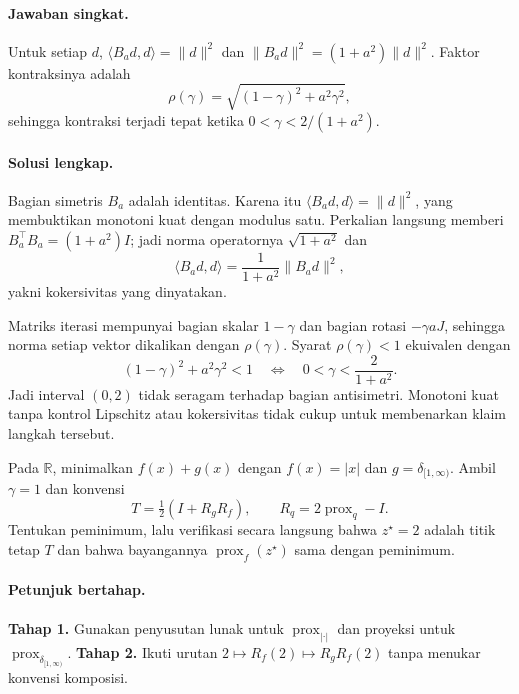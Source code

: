 \paragraph{Jawaban singkat.}
\label{orig03:ps05:answer:0003}
Untuk setiap $d$,
$\langle B_ad,d\rangle=\lVert d\rVert^2$ dan
$\lVert B_ad\rVert^2=(1+a^2)\lVert d\rVert^2$. Faktor kontraksinya adalah
\[
 \rho(\gamma)=\sqrt{(1-\gamma)^2+a^2\gamma^2},
\]
sehingga kontraksi terjadi tepat ketika
$0<\gamma<2/(1+a^2)$.

\paragraph{Solusi lengkap.}
\label{orig03:ps05:solution:0003}
Bagian simetris $B_a$ adalah identitas. Karena itu
$\langle B_ad,d\rangle=\lVert d\rVert^2$, yang membuktikan monotoni kuat
dengan modulus satu. Perkalian langsung memberi
$B_a^\top B_a=(1+a^2)I$; jadi norma operatornya
$\sqrt{1+a^2}$ dan
\[
 \langle B_ad,d\rangle
 =\frac1{1+a^2}\lVert B_ad\rVert^2,
\]
yakni kokersivitas yang dinyatakan.

Matriks iterasi mempunyai bagian skalar $1-\gamma$ dan bagian rotasi
$-\gamma aJ$, sehingga norma setiap vektor dikalikan dengan
$\rho(\gamma)$. Syarat $\rho(\gamma)<1$ ekuivalen dengan
\[
 (1-\gamma)^2+a^2\gamma^2<1
 \quad\Longleftrightarrow\quad
 0<\gamma<\frac{2}{1+a^2}.
\]
Jadi interval $(0,2)$ tidak seragam terhadap bagian antisimetri. Monotoni kuat
tanpa kontrol Lipschitz atau kokersivitas tidak cukup untuk membenarkan klaim
langkah tersebut.

\begin{exercise}
\label{orig03:ps05:exercise:0004}
Pada $\mathbb R$, minimalkan $f(x)+g(x)$ dengan
$f(x)=|x|$ dan $g=\delta_{[1,\infty)}$. Ambil $\gamma=1$ dan konvensi
\[
 T=\tfrac12(I+R_gR_f),
 \qquad R_q=2\operatorname{prox}_q-I.
\]
Tentukan peminimum, lalu verifikasi secara langsung bahwa $z^\star=2$ adalah
titik tetap $T$ dan bahwa bayangannya
$\operatorname{prox}_f(z^\star)$ sama dengan peminimum.
\end{exercise}

\paragraph{Petunjuk bertahap.}
\label{orig03:ps05:hint:0004}
\textbf{Tahap 1.} Gunakan penyusutan lunak untuk $\operatorname{prox}_{|\cdot|}$
dan proyeksi untuk $\operatorname{prox}_{\delta_{[1,\infty)}}$.
\textbf{Tahap 2.} Ikuti urutan $2\mapsto R_f(2)\mapsto R_gR_f(2)$ tanpa
menukar konvensi komposisi.

